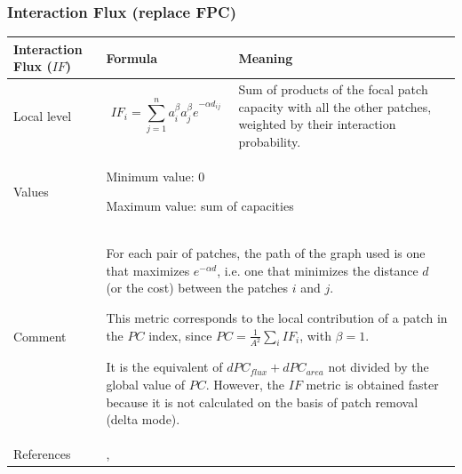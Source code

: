 \documentclass{article}
\begin{document}
\subsubsection{Interaction Flux (replace FPC)}
\label{metric_IF}
\begin{table}[H]
\begin{tabular}{|m{3.24cm}|m{4.4810004cm}m{7.924cm}|}
\hline
Interaction Flux
($IF$) &
\multicolumn{1}{m{4.4810004cm}|}{Formula} &
Meaning\\\hline
Local level &
\multicolumn{1}{m{4.4810004cm}|}{\begin{equation*}
{\mathit{IF}}_{i}=\sum _{j=1}^{n}{{{a}_{i}^{\beta }{a}_{j}^{\beta }e}^{-\alpha {d}_{\mathit{ij}}}}
\end{equation*}
} &
Sum of products of the focal patch capacity with all the other patches,
weighted by their interaction probability.\\\hline
Values &
\multicolumn{2}{m{12.6050005cm}|}{
Minimum value: 0

Maximum value: sum of capacities
}\\\hline
Comment &
\multicolumn{2}{m{12.6050005cm}|}{For each pair of patches, the path of
the graph used is one that maximizes ${e}^{-\mathit{\alpha d}}$, i.e.
one that minimizes the distance $d$ (or the cost) between the patches $i$
and $j$.

This metric corresponds to the local contribution of a patch in the $PC$ index, since  $\mathit{PC}=\frac{1}{A^2}\sum _{i}{{\mathit{IF}}_{i}}$, with $\beta = 1$. 

It is the equivalent of ${dPC}_{flux}+{dPC}_{area}$ not divided
by the global value of $PC$. However, the $IF$ metric is obtained faster because it is not calculated on the basis of patch removal (delta mode).
}\\\hline
References &
\multicolumn{2}{m{12.6050005cm}|}{\cite{2014_LUP},\cite{2017_landmod}}\\\hline
\end{tabular}
\end{table}
\end{document}
